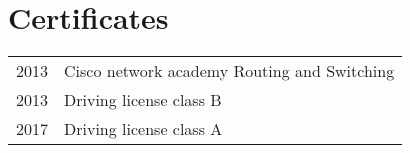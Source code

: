 \documentclass[a4paper,final]{deedy-resume}%
\begin{document}
\begin{minipage}[t]{0.66\textwidth}
    
    \section{Certificates}
    
    \begin{tabular}{rl}
    2013 & Cisco network academy Routing and Switching \\
    2013 & Driving license class B \\
    2017 & Driving license class A
    \end{tabular}
    
    
    \end{minipage} %
    
    
    
    
    
    
    
    
    
    
\end{document}
